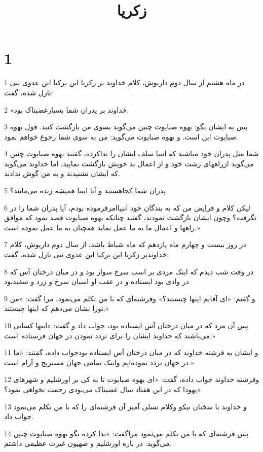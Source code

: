 

\title{زکريا}


\chapter{1}

\par 1 در ماه هشتم از سال دوم داریوش، کلام خداوند بر زکریا ابن برکیا ابن عدوی نبی نازل شده، گفت:
\par 2 «خداوند بر پدران شما بسیارغضبناک بود.
\par 3 پس به ایشان بگو: یهوه صبایوت چنین می‌گوید بسوی من بازگشت کنید. قول یهوه صبایوت این است. و یهوه صبایوت می‌گوید: من به سوی شما رجوع خواهم نمود.
\par 4 شما مثل پدران خود مباشید که انبیا سلف ایشان را نداکرده، گفتند یهوه صبایوت چنین می‌گوید ازراههای زشت خود و از اعمال بد خویش بازگشت نمایید، اما خداوند می‌گوید که ایشان نشنیدند و به من گوش ندادند.
\par 5 پدران شما کجاهستند و آیا انبیا همیشه زنده می‌مانند؟
\par 6 لیکن کلام و فرایض من که به بندگان خود انبیاامرفرموده بودم، آیا پدران شما را در نگرفت؟ وچون ایشان بازگشت نمودند، گفتند چنانکه یهوه صبایوت قصد نمود که موافق راهها و اعمال ما به ما عمل نماید همچنان به ما عمل نموده است.»
\par 7 در روز بیست و چهارم ماه یازدهم که ماه شباط باشد، از سال دوم داریوش، کلام خداوندبر زکریا ابن برکیا ابن عدوی نبی نازل شده، گفت:
\par 8 در وقت شب دیدم که اینک مردی بر اسب سرخ سوار بود و در میان درختان آس که در وادی بود ایستاده و در عقب او اسبان سرخ و زرد و سفیدبود.
\par 9 و گفتم: «ای آقایم اینها چیستند؟» وفرشته‌ای که با من تکلم می‌نمود، مرا گفت: «من تورا نشان می‌دهم که اینها چیستند.»
\par 10 پس آن مرد که در میان درختان آس ایستاده بود، جواب داد و گفت: «اینها کسانی می‌باشند که خداوند ایشان را برای تردد نمودن در جهان فرستاده است.»
\par 11 و ایشان به فرشته خداوند که در میان درختان آس ایستاده بودجواب داده، گفتند: «ما در جهان تردد نموده‌ایم واینک تمامی جهان مستریح و آرام است.»
\par 12 وفرشته خداوند جواب داده، گفت: «ای یهوه صبایوت تا به کی بر اورشلیم و شهرهای یهودا که در این هفتاد سال غضبناک می‌بودی رحمت نخواهی نمود؟»
\par 13 و خداوند با سخنان نیکو وکلام تسلی آمیز آن فرشته‌ای را که با من تکلم می‌نمود جواب داد.
\par 14 پس فرشته‌ای که با من تکلم می‌نمود مراگفت: «ندا کرده بگو یهوه صبایوت چنین می‌گوید: در باره اورشلیم و صهیون غیرت عظیمی داشتم.
